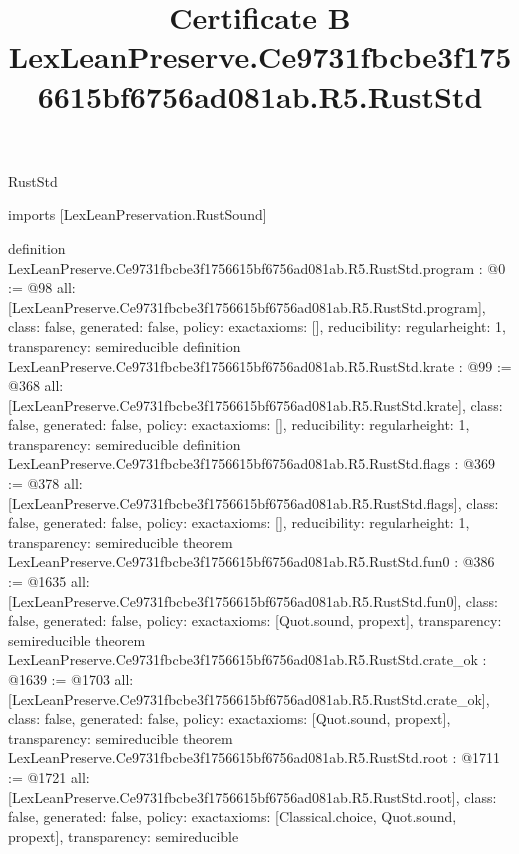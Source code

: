\begin{lexlean}{RustStd}
\title{Certificate B LexLeanPreserve.Ce9731fbcbe3f1756615bf6756ad081ab.R5.RustStd}
\begin{coremodule}
imports [LexLeanPreservation.RustSound]

definition LexLeanPreserve.Ce9731fbcbe3f1756615bf6756ad081ab.R5.RustStd.program : @0 := @98 {
  all: [LexLeanPreserve.Ce9731fbcbe3f1756615bf6756ad081ab.R5.RustStd.program],
  class: false,
  generated: false,
  policy: exact{axioms: []},
  reducibility: regular{height: 1},
  transparency: semireducible
}
definition LexLeanPreserve.Ce9731fbcbe3f1756615bf6756ad081ab.R5.RustStd.krate : @99 := @368 {
  all: [LexLeanPreserve.Ce9731fbcbe3f1756615bf6756ad081ab.R5.RustStd.krate],
  class: false,
  generated: false,
  policy: exact{axioms: []},
  reducibility: regular{height: 1},
  transparency: semireducible
}
definition LexLeanPreserve.Ce9731fbcbe3f1756615bf6756ad081ab.R5.RustStd.flags : @369 := @378 {
  all: [LexLeanPreserve.Ce9731fbcbe3f1756615bf6756ad081ab.R5.RustStd.flags],
  class: false,
  generated: false,
  policy: exact{axioms: []},
  reducibility: regular{height: 1},
  transparency: semireducible
}
theorem LexLeanPreserve.Ce9731fbcbe3f1756615bf6756ad081ab.R5.RustStd.fun0 : @386 := @1635 {
  all: [LexLeanPreserve.Ce9731fbcbe3f1756615bf6756ad081ab.R5.RustStd.fun0],
  class: false,
  generated: false,
  policy: exact{axioms: [Quot.sound, propext]},
  transparency: semireducible
}
theorem LexLeanPreserve.Ce9731fbcbe3f1756615bf6756ad081ab.R5.RustStd.crate_ok : @1639 := @1703 {
  all: [LexLeanPreserve.Ce9731fbcbe3f1756615bf6756ad081ab.R5.RustStd.crate_ok],
  class: false,
  generated: false,
  policy: exact{axioms: [Quot.sound, propext]},
  transparency: semireducible
}
theorem LexLeanPreserve.Ce9731fbcbe3f1756615bf6756ad081ab.R5.RustStd.root : @1711 := @1721 {
  all: [LexLeanPreserve.Ce9731fbcbe3f1756615bf6756ad081ab.R5.RustStd.root],
  class: false,
  generated: false,
  policy: exact{axioms: [Classical.choice, Quot.sound, propext]},
  transparency: semireducible
}


\end{coremodule}
\end{lexlean}

